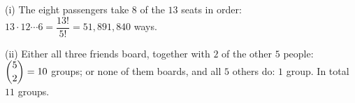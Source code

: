 (i) The eight passengers take $8$ of the $13$ seats in order: $13\cdot12\cdots6=\dfrac{13!}{5!}=\boxed{51{,}891{,}840}$ ways.

(ii) Either all three friends board, together with $2$ of the other $5$ people: $\dbinom52=10$ groups; or none of them boards, and all $5$ others do: $1$ group. In total $\boxed{11}$ groups.
